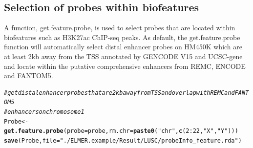 \documentclass{article}\usepackage[]{graphicx}\usepackage[usenames,dvipsnames]{color}
\makeatletter
\newcommand{\hlnum}[1]{\textcolor[rgb]{0.686,0.059,0.569}{#1}}%
\newcommand{\hlstr}[1]{\textcolor[rgb]{0.192,0.494,0.8}{#1}}%
\newcommand{\hlcom}[1]{\textcolor[rgb]{0.678,0.584,0.686}{\textit{#1}}}%
\newcommand{\hlopt}[1]{\textcolor[rgb]{0,0,0}{#1}}%
\newcommand{\hlstd}[1]{\textcolor[rgb]{0.345,0.345,0.345}{#1}}%
\newcommand{\hlkwb}[1]{\textcolor[rgb]{0.69,0.353,0.396}{#1}}%
\newcommand{\hlkwc}[1]{\textcolor[rgb]{0.333,0.667,0.333}{#1}}%
\newcommand{\hlkwd}[1]{\textcolor[rgb]{0.737,0.353,0.396}{\textbf{#1}}}%
\newenvironment{kframe}{%
 \def\at@end@of@kframe{}%
 \ifinner\ifhmode%
  \def\at@end@of@kframe{\end{minipage}}%
  \begin{minipage}{\columnwidth}%
 \fi\fi%
 \def\FrameCommand##1{\hskip\@totalleftmargin \hskip-\fboxsep
 \colorbox{shadecolor}{##1}\hskip-\fboxsep
     \hskip-\linewidth \hskip-\@totalleftmargin \hskip\columnwidth}%
 \MakeFramed {\advance\hsize-\width
   \@totalleftmargin\z@ \linewidth\hsize
   \@setminipage}}%
 {\par\unskip\endMakeFramed%
 \at@end@of@kframe}
\newenvironment{knitrout}{}{} %
\makeatother
\begin{document}
\subsection{Selection of probes within biofeatures}
A function, get.feature.probe, is used to select probes that are located within 
biofeatures such as H3K27ac ChIP-seq peaks. As default, the get.feature.probe function
will automatically select distal enhancer probes on HM450K which are at least 
2kb away from the TSS annotated by GENCODE V15 and UCSC-gene and locate within 
the putative comprehensive enhancers from REMC, ENCODE and FANTOM5. 
\begin{knitrout}
\color{fgcolor}\begin{kframe}
\begin{alltt}
\hlcom{#get distal enhancer probes that are 2kb away from TSS and overlap with REMC and FANTOM5 }
\hlcom{#enhancers on chromosome 1}
\hlstd{Probe} \hlkwb{<-} \hlkwd{get.feature.probe}\hlstd{(}\hlkwc{probe}\hlstd{=probe,} \hlkwc{rm.chr}\hlstd{=}\hlkwd{paste0}\hlstd{(}\hlstr{"chr"}\hlstd{,}\hlkwd{c}\hlstd{(}\hlnum{2}\hlopt{:}\hlnum{22}\hlstd{,}\hlstr{"X"}\hlstd{,}\hlstr{"Y"}\hlstd{)))}
\hlkwd{save}\hlstd{(Probe,}\hlkwc{file}\hlstd{=}\hlstr{"./ELMER.example/Result/LUSC/probeInfo_feature.rda"}\hlstd{)}
\end{alltt}
\end{kframe}
\end{knitrout}
\end{document}
